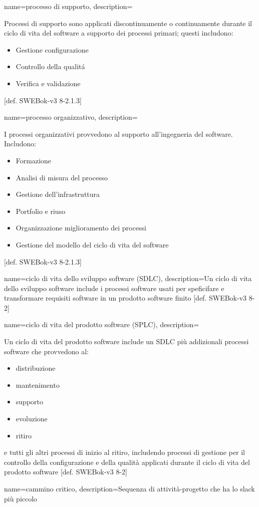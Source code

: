 {
name=processo di supporto,
description={Processi di supporto sono applicati discontinuamente o continuamente durante il ciclo di vita del software a supporto dei processi primari; questi includono:\begin{itemize}
\item Gestione configurazione
\item Controllo della qualit\'a
\item Verifica e validazione
\end{itemize}
[def. SWEBok-v3 8-2.1.3]}
}

{
name=processo organizzativo,
description={I processi organizzativi provvedono al supporto all'ingegneria del software. Includono: \begin{itemize}
\item Formazione
\item Analisi di misura del processo
\item Gestione dell'infrastruttura
\item Portfolio e riuso
\item Organizzazione miglioramento dei processi
\item Gestione del modello del ciclo di vita del software
\end{itemize}
[def. SWEBok-v3 8-2.1.3]}
}

{
name=ciclo di vita dello sviluppo software (SDLC),
description={Un ciclo di vita dello sviluppo software include i processi software usati per speficifare e transformare requisiti software in un prodotto software finito [def. SWEBok-v3 8-2]}
}

{
name=ciclo di vita del prodotto software (SPLC),
description={Un ciclo di vita del prodotto software include un SDLC pi\`u addizionali processi software che provvedono al: \begin{itemize}
\item distribuzione
\item mantenimento
\item supporto
\item evoluzione
\item ritiro
\end{itemize}
e tutti gli altri processi di inizio al ritiro, includendo processi di gestione per il controllo della configurazione e della qualit\`a applicati durante il ciclo di vita del prodotto software [def. SWEBok-v3 8-2]}
}

{
name=cammino critico,
description={Sequenza di attivit\`a-progetto che ha lo slack pi\`u piccolo}
}

